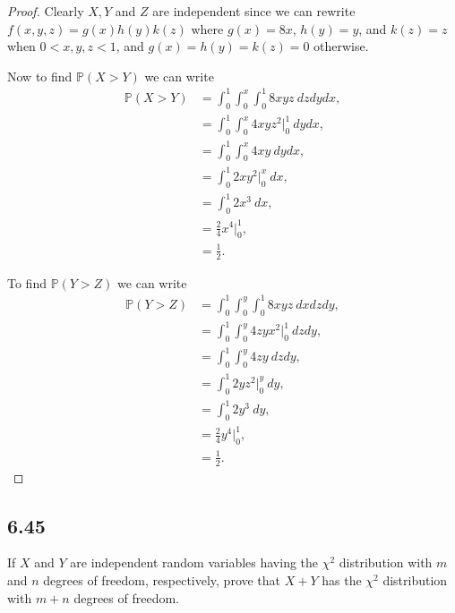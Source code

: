 \documentclass{article}
\renewcommand{\P}[1]{\mathbb{P}(#1)}
\begin{document}
\begin{proof}
    Clearly $X, Y$ and $Z$ are independent since we can rewrite
    $f(x,y,z) = g(x)h(y)k(z)$ where $g(x) = 8x$, $h(y) = y$, and
    $k(z) = z$ when $0 < x,y,z < 1$, and $g(x)=h(y)=k(z) = 0$
    otherwise.

    Now to find $\P{X > Y}$ we can write
    \begin{align*}
        \P{X > Y} & = \int_0^1 \int_0^x \int_0^1 8xyz \ dzdydx,   \\
                  & = \int_0^1 \int_0^x 4xyz^2 \big |_0^1 \ dydx, \\
                  & = \int_0^1 \int_0^x 4xy \ dydx,               \\
                  & = \int_0^1 2xy^2 \big |_0^x \ dx,             \\
                  & = \int_0^1 2x^3 \ dx,                         \\
                  & = \frac{2}{4}x^4 \big |_0^1,                  \\
                  & = \frac{1}{2}.
    \end{align*}

    To find $\P{Y > Z}$ we can write
    \begin{align*}
        \P{Y > Z} & = \int_0^1 \int_0^y \int_0^1 8xyz \ dxdzdy,   \\
                  & = \int_0^1 \int_0^y 4zyx^2 \big |_0^1 \ dzdy, \\
                  & = \int_0^1 \int_0^y 4zy \ dzdy,               \\
                  & = \int_0^1 2yz^2 \big |_0^y \ dy,             \\
                  & = \int_0^1 2y^3 \ dy,                         \\
                  & = \frac{2}{4}y^4 \big |_0^1,                  \\
                  & = \frac{1}{2}.
    \end{align*}
\end{proof}

\subsection*{6.45}
If $X$ and $Y$ are independent random variables having the $\chi^2$ distribution
with $m$ and $n$ degrees of freedom, respectively, prove that $X+Y$ has the
$\chi^2$ distribution with $m+n$ degrees of freedom.
\end{document}

